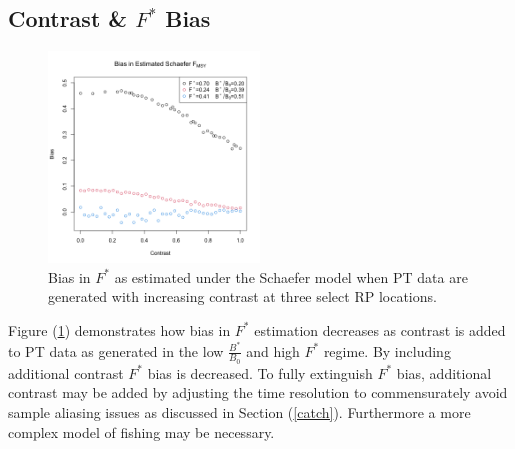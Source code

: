 %
\subsection{Contrast \& $F^*$ Bias}

%
\begin{figure}
\vspace{-1.5cm}
\includegraphics[width=0.5\textwidth]{../ptNew/contrastTest3.png}
\caption{
Bias in $F^*$ as estimated under the Schaefer model when PT data are generated
with increasing contrast at three select RP locations. 
\label{conTest}}
\end{figure}

%
Figure (\ref{conTest}) demonstrates how bias in $F^*$ estimation %
decreases as contrast is added to PT data as generated in the low $\frac{B^*}{B_0}$ and
high $F^*$ regime. By including additional contrast $F^*$ bias is decreased. To fully 
extinguish $F^*$ bias, additional contrast may be added by adjusting the time resolution 
to commensurately avoid sample aliasing issues as discussed in Section (\ref{catch}). 
Furthermore a more complex model of fishing may be necessary.  

